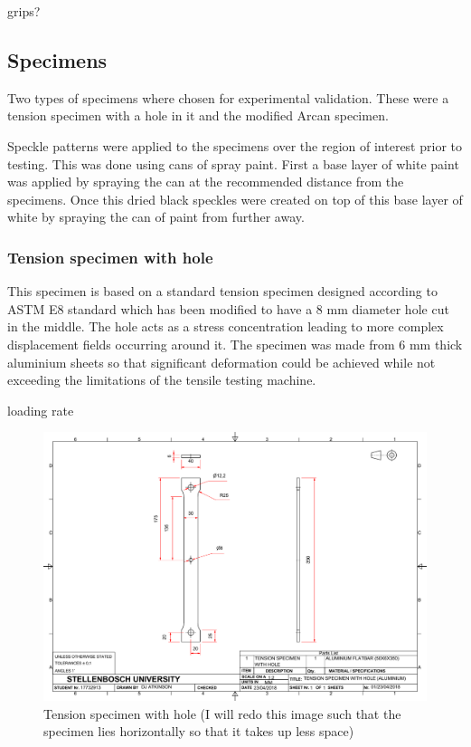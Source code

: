 \documentclass[12pt,oneside,openany,a4paper, %
english, %
masters-t, goldenblock]{usthesis}
\begin{document}
grips?

\subsection{Specimens}
Two types of specimens where chosen for experimental validation. These were a tension specimen with a hole in it and the modified Arcan specimen.

Speckle patterns were applied to the specimens over the region of interest prior to testing. This was done using cans of spray paint. First a base layer of white paint was applied by spraying the can at the recommended distance from the specimens. Once this dried black speckles were created on top of this base layer of white by spraying the can of paint from further away. 

\subsubsection{Tension specimen with hole}
This specimen is based on a standard tension specimen designed according to ASTM E8 standard \cite{astm2009standard} which has been modified to have a 8 mm diameter hole cut in the middle. The hole acts as a stress concentration leading to more complex displacement fields occurring around it. The specimen was made from 6 mm thick aluminium sheets so that significant deformation could be achieved while not exceeding the limitations of the tensile testing machine. 

loading rate

\begin{figure}[H]
    \centering
        \includegraphics[trim={7cm 6cm 7cm 4.5cm}, clip, scale=0.5]{sheet specimen 8mm.pdf}
    \caption{Tension specimen with hole (I will redo this image such that the specimen lies horizontally so that it takes up less space)}
    \label{fig: tension specimen hole}
\end{figure}
\end{document}
